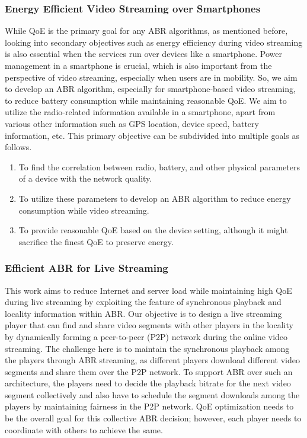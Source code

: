 \subsubsection{Energy Efficient Video Streaming over Smartphones}
While QoE is the primary goal for any ABR algorithms, as mentioned before, looking into secondary objectives such as energy efficiency during video streaming is also essential when the services run over devices like a smartphone. Power management in a smartphone is crucial, which is also important from the perspective of video streaming, especially when users are in mobility. So, we aim to develop an ABR algorithm, especially for smartphone-based video streaming, to reduce battery consumption while maintaining reasonable QoE. We aim to utilize the radio-related information available in a smartphone, apart from various other information such as GPS location, device speed, battery information, etc. This primary objective can be subdivided into multiple goals as follows.
\begin{enumerate}
	\item To find the correlation between radio, battery, and other physical parameters of a device with the network quality.
	\item To utilize these parameters to develop an ABR algorithm to reduce energy consumption while video streaming.
	\item To provide reasonable QoE based on the device setting, although it might sacrifice the finest QoE to preserve energy.
\end{enumerate}

\subsubsection{Efficient ABR for Live Streaming}
This work aims to reduce Internet and server load while maintaining high QoE during live streaming by exploiting the feature of synchronous playback and locality information within ABR. Our objective is to design a live streaming player that can find and share video segments with other players in the locality by dynamically forming a peer-to-peer (P2P) network during the online video streaming. The challenge here is to maintain the synchronous playback among the players through ABR streaming, as different players download different video segments and share them over the P2P network. To support ABR over such an architecture, the players need to decide the playback bitrate for the next video segment collectively and also have to schedule the segment downloads among the players by maintaining fairness in the P2P network. QoE optimization needs to be the overall goal for this collective ABR decision; however, each player needs to coordinate with others to achieve the same. 

